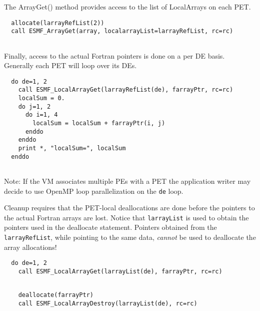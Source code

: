    The ArrayGet() method provides access to the list of LocalArrays on each PET. 

 \begin{verbatim}
  allocate(larrayRefList(2))
  call ESMF_ArrayGet(array, localarrayList=larrayRefList, rc=rc)
 
\end{verbatim}
 

   Finally, access to the actual Fortran pointers is done on a per DE basis.
   Generally each PET will loop over its DEs. 

 \begin{verbatim}
  do de=1, 2
    call ESMF_LocalArrayGet(larrayRefList(de), farrayPtr, rc=rc)
    localSum = 0.
    do j=1, 2
      do i=1, 4
        localSum = localSum + farrayPtr(i, j)
      enddo
    enddo
    print *, "localSum=", localSum
  enddo
 
\end{verbatim}
 

   Note: If the VM associates multiple PEs with a PET the application writer 
   may decide to use OpenMP loop parallelization on the {\tt de} loop.
  
   Cleanup requires that the PET-local deallocations are done before the 
   pointers to the actual Fortran arrays are lost. Notice that {\tt larrayList}
   is used to obtain the pointers used in the deallocate statement. Pointers
   obtained from the {\tt larrayRefList}, while pointing to the same data, 
   {\em cannot} be used to deallocate the array allocations! 

 \begin{verbatim}
  do de=1, 2
    call ESMF_LocalArrayGet(larrayList(de), farrayPtr, rc=rc)
 
\end{verbatim}
 

 \begin{verbatim}
    deallocate(farrayPtr)
    call ESMF_LocalArrayDestroy(larrayList(de), rc=rc)
 
\end{verbatim}
 
